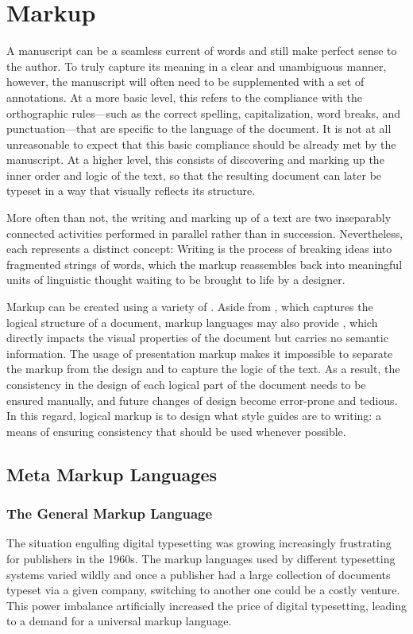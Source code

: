 \chapter{Markup}
A manuscript can be a seamless current of words and still make perfect sense to
the author. To truly capture its meaning in a clear and unambiguous manner,
however, the manuscript will often need to be supplemented with a set of
annotations. At a more basic level, this refers to the compliance with the
orthographic rules---such as the correct spelling, capitalization, word breaks,
and punctuation---that are specific to the language of the document.  It is not
at all unreasonable to expect that this basic compliance should be already met
by the manuscript. At a higher level, this consists of discovering and marking
up the inner order and logic of the text, so that the resulting document can
later be typeset in a way that visually reflects its structure.

More often than not, the writing and marking up of a text are two inseparably
connected activities performed in parallel rather than in succession.
Nevertheless, each represents a distinct concept: Writing is the process of
breaking ideas into fragmented strings of words, which the markup reassembles
back into meaningful units of linguistic thought waiting to be brought to life
by a designer.

Markup can be created using a variety of . Aside from
, which captures the logical structure of a document,
markup languages may also provide , which directly
impacts the visual properties of the document but carries no semantic
information. The usage of presentation markup makes it impossible to separate
the markup from the design and to capture the logic of the text. As a result,
the consistency in the design of each logical part of the document needs to be
ensured manually, and future changes of design become error-prone and tedious.
In this regard, logical markup is to design what style guides are to writing: a
means of ensuring consistency that should be used whenever possible.

\section{Meta Markup Languages}
\subsection{The General Markup Language}
The situation engulfing digital typesetting was growing increasingly frustrating
for publishers in the 1960s. The markup languages used by different typesetting
systems varied wildly and once a publisher had a large collection of documents
typeset via a given company, switching to another one could be a costly
venture. This power imbalance artificially increased the price of digital
typesetting, leading to a demand for a universal markup language.


